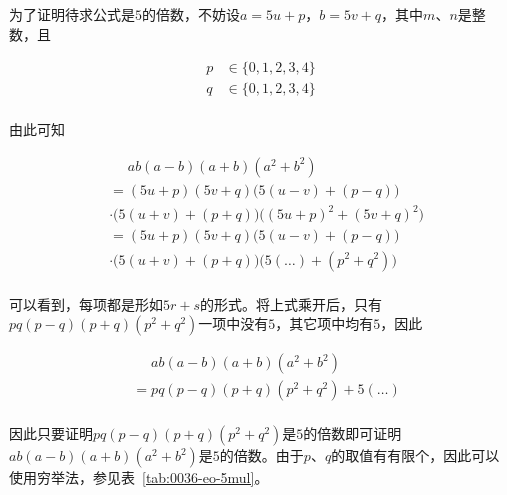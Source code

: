 为了证明待求公式是$5$的倍数，不妨设$a = 5u + p$，$b = 5v + q$，其中$m$、$n$是整数，且

\begin{align*}
  p &\in \{0, 1, 2, 3, 4\} \\
  q &\in \{0, 1, 2, 3, 4\} \\
\end{align*}

\vspace{-19pt}

由此可知

\vspace{-19pt}

\begin{align*}
  &\phantom{=} ab(a - b)(a + b)(a^2 + b^2) \\
  &= (5u + p)(5v + q)\Big(5(u - v) + (p - q)\Big) \\
  &\cdot\Big(5(u + v) + (p + q)\Big)\Big((5u + p)^2 + (5v + q)^2\Big) \\
  &= (5u + p)(5v + q)\Big(5(u - v) + (p - q)\Big) \\
  &\cdot\Big(5(u + v) + (p + q)\Big)\Big(5(\dots) + (p^2 + q^2)\Big) \\
\end{align*}

\vspace{-19pt}

可以看到，每项都是形如$5r + s$的形式。将上式乘开后，只有$pq(p - q)(p + q)(p^2 + q^2)$一项中没有$5$，其它项中均有$5$，因此

\vspace{-16pt}

\begin{align*}
  &\phantom{=} ab(a - b)(a + b)(a^2 + b^2) \\
  &= pq(p - q)(p + q)(p^2 + q^2) + 5(\dots) \\
\end{align*}

\vspace{-19pt}

因此只要证明$pq(p - q)(p + q)(p^2 + q^2)$是$5$的倍数即可证明$ab(a - b)(a + b)(a^2 + b^2)$是$5$的倍数。由于$p$、$q$的取值有有限个，因此可以使用穷举法，参见表~\ref{tab:0036-eo-5mul}。


